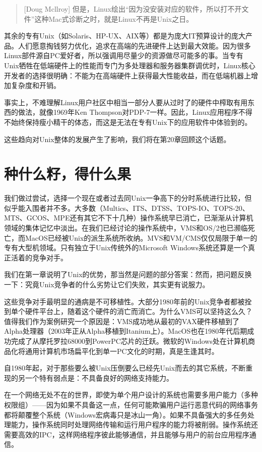 \documentclass[11pt,oneside]{book}
\begin{document}
\begin{common-format}
\begin{quote}[Doug Mcllroy]
但是，Linux绘出“因为没安装对应的软件，所以打不开文件”这种Mac式诊断之时，就是Linux不再是Unix之日。
\end{quote}

其余的专有Unix（如Solaris、HP-UX、AIX等）都是为庞大IT预算设计的庞大产品。人们愿意掏钱努力优化，追求在高端的先进硬件上达到最大效能。因为很多Linux部件源自PC爱好者，所以强调用尽量少的资源做尽可能多的事。当专有Unix牺牲在低端硬件上的性能而专门为多处理器和服务器集群调优时，Linux核心开发者的选择很明确：不能为在高端硬件上获得最大性能收益，而在低端机器上增加复杂度和开销。

事实上，不难理解Linux用户社区中相当一部分人要从过时了的硬件中榨取有用东西的做法，就像1969年Ken Thompson对PDP-7一样。因此，Linux应用程序不得不始终保持瘦小精干的体态，而这是无法在专有Unix下的应用软件中体验到的。

这些趋向对Unix整体的发展产生了影响，我们将在第20章回顾这个话题。


\section{种什么籽，得什么果}
我们做过尝试，选择一个现在或者过去同Unix一争高下的分时系统进行比较，但似乎能入围者并不多。大多数（Multics、ITS、DTSS、TOPS-IO、TOPS-20、MTS、GCOS、MPE还有其它不下十几种）操作系统早已消亡，已渐渐从计算机领域的集体记忆中淡出。在我们已经讨论的操作系统中，VMS和OS/2也已濒临死亡，而MacOS已经被Unix的派生系统所收纳。MVS和VM/CMS仅仅局限于单一的专有大型机领域。只有独立于Unix传统外的Microsoft Windows系统还算是一个真正活着的竞争对手。

我们在第一章说明了Unix的优势，那当然是问题的部分答案：然而，把问题反换一下：究竟Unix竞争者的什么劣势让它们失败，其实更有说服力。

这些竞争对手最明显的通病是不可移植性。大部分1980年前的Unix竞争者都被拴到单个硬件平台上，随着这个硬件的消亡而消亡。为什么VMS可以坚持这么久？值得我们作为案例研究一个原因是：VMS成功地从最初的VAX硬件移植到了Alpha处理器（2003年正从Alpha移植到Itanium上）。MacOS也在1980年代后期成功完成了从摩托罗拉68000到PowerPC芯片的迁跃。微软的Windows处在计算机商品化将通用计算机市场扁平化到单一PC文化的时期，真是生逢其时。

自1980年起，对于那些要么被Unix压倒要么已经先Unix而去的其它系统，不断重现的另一个特有弱点是：不具备良好的网络支持能力。

在一个网络无处不在的世界，即使为单个用户设计的系统也需要多用户能力（多种权限组）——因为如果不具备这一点，任何可能欺骗用户运行恶意代码的网络事务都将颠覆整个系统（Windows宏病毒只是冰山一角）。如果不具备强大的多任务处理能力，操作系统同时处理网络传输和运行用户程序的能力将被削弱。操作系统还需要高效的IPC，这样网络程序彼此能够通信，并且能够与用户的前台应用程序通信。


\end{common-format}
\end{document}
